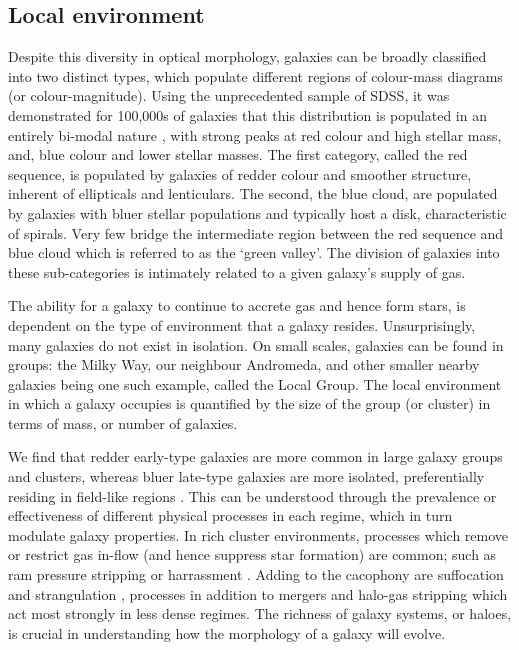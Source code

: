 \subsection{Local environment}
Despite this diversity in optical morphology, galaxies can be broadly classified into two distinct types, which populate different regions of colour-mass diagrams (or colour-magnitude). Using the unprecedented sample of SDSS, it was demonstrated for 100,000s of galaxies that this distribution is populated in an entirely bi-modal nature \citep[see;][]{baldry2004, baldry2006}, with strong peaks at red colour and high stellar mass, and, blue colour and lower stellar masses. The first category, called the red sequence, is populated by galaxies of redder colour and smoother structure, inherent of ellipticals and lenticulars. The second, the blue cloud, are populated by galaxies with bluer stellar populations and typically host a disk, characteristic of spirals. Very few bridge the intermediate region between the red sequence and blue cloud which is referred to as the `green valley'. The division of galaxies into these sub-categories is intimately related to a given galaxy's supply of gas. 

The ability for a galaxy to continue to accrete gas and hence form stars, is dependent on the type of environment that a galaxy resides. Unsurprisingly, many galaxies do not exist in isolation. On small scales, galaxies can be found in groups: the Milky Way, our neighbour Andromeda, and other smaller nearby galaxies being one such example, called the Local Group. The local environment in which a galaxy occupies is quantified by the size of the group (or cluster) in terms of mass, or number of galaxies.

We find that redder early-type galaxies are more common in large galaxy groups and clusters, whereas bluer late-type galaxies are more isolated, preferentially residing in field-like regions \citep[e.g.][]{dressler1980, whitmore1993}. This can be understood through the prevalence or effectiveness of different physical processes in each regime, which in turn modulate galaxy properties. In rich cluster environments, processes which remove or restrict gas in-flow (and hence suppress star formation) are common; such as ram pressure stripping \citep[e.g.][]{gunn1972} or harrassment \citep[e.g.][]{moore1996}. Adding to the cacophony are suffocation and strangulation \citep[e.g.][]{larson1980}, processes in addition to mergers and halo-gas stripping which act most strongly in less dense regimes. The richness of galaxy systems, or haloes, is crucial in understanding how the morphology of a galaxy will evolve.

